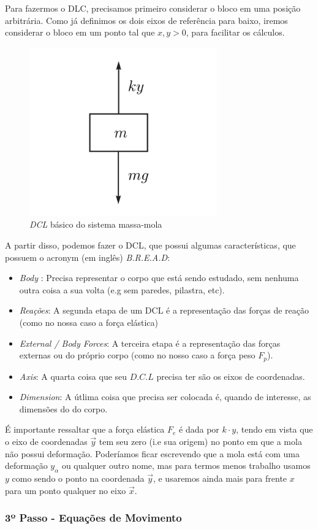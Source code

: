 \documentclass{article}
\begin{document}
Para fazermos o DLC, precisamos primeiro considerar o bloco em uma posição arbitrária. Como já definimos os dois eixos de referência para baixo, iremos considerar o bloco em um
ponto tal que $x,y>0$, para facilitar os cálculos.

\begin{figure}[h]
    \centering
    \includegraphics[width=.3\linewidth]{imgs/sis_mass_mola_1_dcl.png}
    \caption{\emph{DCL} básico do sistema massa-mola}
\end{figure}

A partir disso, podemos fazer o DCL, que possui algumas características, que possuem o acronym (em inglês) \emph{B.R.E.A.D}:
\begin{itemize}
    \item \emph{Body} : Precisa representar o corpo que está sendo estudado, sem nenhuma outra coisa a sua volta (e.g sem paredes, pilastra, etc).
    \item \emph{Reações}: A segunda etapa de um DCL é a representação das forças de reação (como no nossa caso a força elástica)
    \item \emph{External / Body Forces}: A terceira etapa é a representação das forças externas ou do próprio corpo (como no nosso caso a força peso $F_p$).
    \item \emph{Axis}: A quarta coisa que seu $D.C.L$ precisa ter são os eixos de coordenadas.
    \item \emph{Dimension}: A útlima coisa que precisa ser colocada é, quando de interesse, as dimensões do do corpo.
\end{itemize}

É importante ressaltar que a força elástica $F_e$ é dada por $k\cdot y$, tendo em vista que o eixo de coordenadas $\vec y$ tem
seu zero (i.e sua origem) no ponto em que a mola não possui deformação. Poderíamos ficar escrevendo que a mola está com uma deformação $y_\alpha$ ou qualquer outro nome, mas para
termos menos trabalho usamos $y$ como sendo o ponto na coordenada $\vec y$, e usaremos ainda mais para frente $x$ para um ponto qualquer no eixo $\vec x$.

\subsubsection*{3º Passo - Equações de Movimento}
\end{document}
